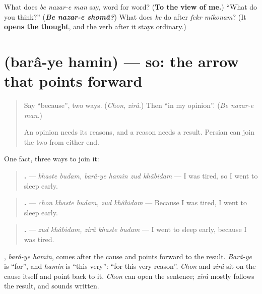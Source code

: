 \begin{tcolorbox}[breakable,colback=teal!4,colframe=teal!35!black,title={Before you move on}]
What does \emph{be nazar-e man} say, word for word? (\textbf{To the view of me.}) \textquotedblleft{}What do you think?\textquotedblright{} (\emph{\textbf{Be nazar-e shomâ?}}) What does \emph{ke} do after \emph{fekr mikonam}? (It \textbf{opens the thought}, and the verb after it stays ordinary.)
\end{tcolorbox}
\section[\texorpdfstring{\fa{برای} \fa{همین} (barâ-ye hamin)}{برای همین (barâ-ye hamin)}]{  (barâ-ye hamin) — so: the arrow that points forward}

\label{lesson:FA-C292-baraye-hamin}



\begin{quote}
Say \textquotedblleft{}because\textquotedblright{}, two ways. (\emph{Chon}, \emph{zirâ}.) Then \textquotedblleft{}in my opinion\textquotedblright{}. (\emph{Be nazar-e man.})

An opinion needs its reasons, and a reason needs a result. Persian can join the two from either end.
\end{quote}

\begin{grammarlens}[title={Grammar Lens: two arrows}]
One fact, three ways to join it:

\begin{quote}
\textbf{     .} — \emph{khaste budam, barâ-ye hamin zud khâbidam} — I was tired, so I went to sleep early.
\end{quote}

\begin{quote}
\textbf{    .} — \emph{chon khaste budam, zud khâbidam} — Because I was tired, I went to sleep early.
\end{quote}

\begin{quote}
\textbf{    .} — \emph{zud khâbidam, zirâ khaste budam} — I went to sleep early, because I was tired.
\end{quote}

\textbf{ }, \emph{barâ-ye hamin}, comes after the cause and points forward to the result. \emph{Barâ-ye} is \textquotedblleft{}for\textquotedblright{}, and \emph{hamin} is \textquotedblleft{}this very\textquotedblright{}: \textquotedblleft{}for this very reason\textquotedblright{}. \emph{Chon} and \emph{zirâ} sit on the cause itself and point back to it. \emph{Chon} can open the sentence; \emph{zirâ} mostly follows the result, and sounds written.
\end{grammarlens}

